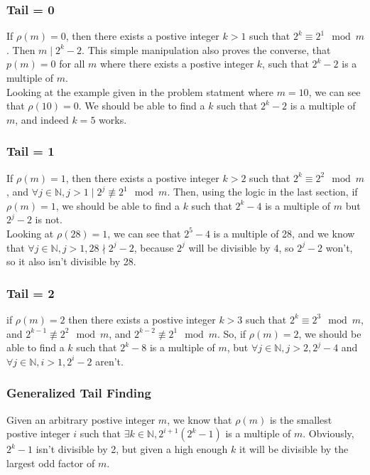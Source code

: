 \documentclass{article}
\begin{document}
  \subsubsection{Tail = 0}
  If $\rho (m) = 0$, then there exists a postive integer $k > 1$ such that $2^k \equiv 2^1 \mod m$. Then $m \mid 2^k - 2$. This simple manipulation also proves the converse, that $p(m) = 0$ for all $m$ where there exists a postive integer $k$, such that $2^k - 2$ is a multiple of $m$.\\

  Looking at the example given in the problem statment where $m=10$, we can see that $\rho(10) = 0$. We should be able to find a $k$ such that $2^k -2$ is a multiple of $m$, and indeed $k=5$ works.
  \subsubsection{Tail = 1}
  If $\rho (m) = 1$, then there exists a postive integer $k > 2$ such that $2^k \equiv 2^2 \mod m$, and $\forall j \in \mathbb{N}, j > 1 \mid 2^{j} \not\equiv 2^1 \mod m$. Then, using the logic in the last section, if $\rho(m) = 1$, we should be able to find a $k$ such that $2^k - 4$ is a multiple of $m$ but $2^j - 2$ is not.\\

  Looking at $\rho(28) = 1$, we can see that $2^5 - 4$ is a multiple of 28, and we know that $\forall j \in \mathbb{N}, j > 1, 28 \nmid 2^j - 2$, because $2^j$ will be divisible by 4, so $2^j - 2$ won't, so it also isn't divisible by 28. 
  \subsubsection{Tail = 2}
  if $\rho (m) = 2$ then there exists a postive integer $k > 3$ such that $2^k \equiv 2^3 \mod m$, and $2^{k-1} \not\equiv 2^2 \mod m$, and $2^{k-2} \not\equiv 2^1 \mod m$. So, if $\rho(m) = 2$, we should be able to find a $k$ such that $2^k - 8$ is a multiple of $m$, but $\forall j \in \mathbb{N}, j > 2, 2^{j} - 4$ and $\forall j \in \mathbb{N}, i > 1, 2^{i} - 2$ aren't.
  \subsubsection{Generalized Tail Finding}
  Given an arbitrary postive integer $m$, we know that $\rho(m)$ is the smallest postive integer $i$ such that $\exists k \in \mathbb{N}, 2^{i+1}(2^k - 1)$ is a multiple of $m$. Obviously, $2^k-1$ isn't divisible by 2, but given a high enough $k$ it will be divisible by the largest odd factor of $m$.\\
\end{document}
